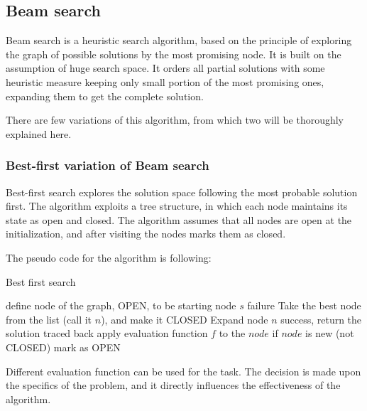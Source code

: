 \subsection{Beam search}

Beam search is a heuristic search algorithm, based on the principle of exploring the graph of possible solutions by the most promising node. It is built on the assumption of huge search space. It orders all partial solutions with some heuristic measure keeping only small portion of the most promising ones, expanding them to get the complete solution.

There are few variations of this algorithm, from which two will be thoroughly explained here.

\subsubsection{Best-first variation of Beam search}

Best-first search explores the solution space following the most probable solution first. The algorithm exploits a tree structure, in which each node maintains its state as open and closed. The algorithm assumes that all nodes are open at the initialization, and after visiting the nodes marks them as closed. 

The pseudo code for the algorithm is following:


\begin{algorithm}
	\caption{Best first search}
	\label{alg:protrack}
	\begin{algorithmic}[1]
		\State define node of the graph, OPEN, to be starting node $s$
		\State	failure
		\EndIf
		\State Take the best node from the list (call it $n$), and make it CLOSED
		\State Expand node $n$
			\State	success, return the solution traced back
		\EndIf
		\State	apply evaluation function $f$ to the $node$\;
		\State	if $node$ is new (not CLOSED) mark as OPEN\;
		\EndFor
	\end{algorithmic}
\end{algorithm}



\vspace{0.2 cm}

Different evaluation function can be used for the task. The decision is made upon the specifics of the problem, and it directly influences the effectiveness of the algorithm. 


